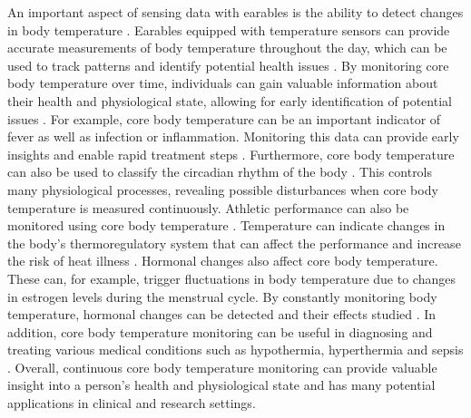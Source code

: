 An important aspect of sensing data with earables is the ability to detect changes in body temperature \cite{dolsonWearableSensorTechnology2022, bonziAccuracyPeripheralThermometers2016, NovelWearableDevice2021}. 
Earables equipped with temperature sensors can provide accurate measurements of body temperature throughout the day, which can be used to track patterns and identify potential health issues \cite{rajbhandaryFeasibilityContinuousMonitoring2020a}.
By monitoring core body temperature over time, individuals can gain valuable information about their health and physiological state, allowing for early identification of potential issues \cite{mrozekBrainTemperaturePhysiology2012}.
For example, core body temperature can be an important indicator of fever as well as infection or inflammation. 
Monitoring this data can provide early insights and enable rapid treatment steps \cite{NovelWearableDevice2021}.
Furthermore, core body temperature can also be used to classify the circadian rhythm of the body \cite{liCircadianRhythmAnalysis2021, juSleepQualityPreclinical2013}.
This controls many physiological processes, revealing possible disturbances when core body temperature is measured continuously.
Athletic performance can also be monitored using core body temperature \cite{boanoNoninvasiveMeasurementCore2013}.
Temperature can indicate changes in the body's thermoregulatory system that can affect the performance and increase the risk of heat illness \cite{gabbettAthleteMonitoringCycle2017, silvaSleepQualityTraining2022}.
Hormonal changes also affect core body temperature. 
These can, for example, trigger fluctuations in body temperature due to changes in estrogen levels during the menstrual cycle. 
By constantly monitoring body temperature, hormonal changes can be detected and their effects studied \cite{goeckenjanContinuousBodyTemperature2020, charkoudianAutonomicControlBody2017, hamataniEstimatingCoreBody2015}.
In addition, core body temperature monitoring can be useful in diagnosing and treating various medical conditions such as hypothermia, hyperthermia and sepsis \cite{hardingTemperatureDependenceSleep2019, guilleminaultChronicInsomniaPremenopausal2002, raymannSkinDeepEnhanced2008}.
Overall, continuous core body temperature monitoring can provide valuable insight into a person's health and physiological state and has many potential applications in clinical and research settings.

